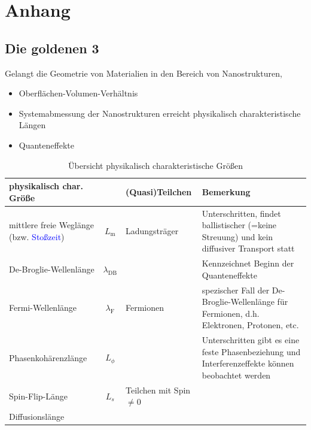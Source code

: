 \documentclass{article}
\begin{document}
\newpage


\section{Anhang}
\subsection{Die goldenen 3}
Gelangt die Geometrie von Materialien in den Bereich von Nanostrukturen, 
	\begin{itemize}
		\item Oberflächen-Volumen-Verhältnis
		
		\item Systemabmessung der Nanostrukturen erreicht physikalisch charakteristische Längen
		
		\item Quanteneffekte
	\end{itemize}


\begin{table}[H]
	\centering
	\caption{Übersicht physikalisch charakteristische Größen}
	\begin{tabularx}{\textwidth}{X|c|X|X}
		\hline\hline
			physikalisch char. Größe &  & (Quasi)Teilchen & Bemerkung \\
		\hline
			mittlere freie Weglänge (bzw. \textcolor{blue}{Stoßzeit}) & $L_{\text{m}}$ & Ladungsträger & Unterschritten, findet ballistischer \textcolor{gruen}{(=keine Streuung)} und kein diffusiver Transport statt \\
		\hline
			De-Broglie-Wellenlänge & $\lambda_{\text{DB}}$ &  & Kennzeichnet Beginn der Quanteneffekte \\
		\hline
			\textcolor{gruen}{Fermi-Wellenlänge} & $\lambda_{\text{F}}$ &  Fermionen & spezischer Fall der De-Broglie-Wellenlänge für Fermionen, d.h. Elektronen, Protonen, etc. \\
		\hline
			Phasenkohärenzlänge & $L_\phi$ &  & Unterschritten gibt es eine feste Phasenbeziehung und Interferenzeffekte können beobachtet werden \\
		\hline
			Spin-Flip-Länge & $L_s$ & Teilchen mit Spin $\neq 0$ &  \\
		\hline
			Diffusionslänge & &  \\
		\hline\hline
	\end{tabularx}
\end{table}


\newpage
\end{document}

